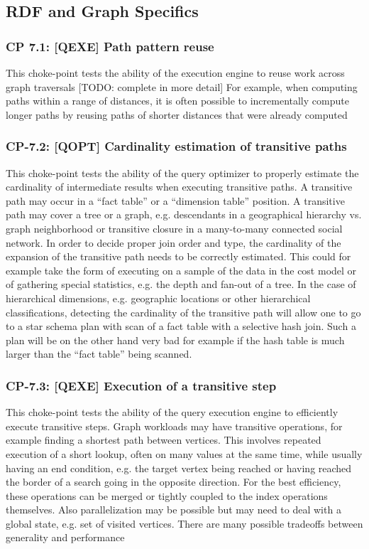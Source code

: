 
\subsection{RDF and Graph Specifics}

\subsubsection{CP 7.1: [QEXE] Path pattern reuse}
\label{choke_point_7.1}
This choke-point tests the ability of the execution engine to reuse work across graph traversals [TODO: complete in more detail]
For example, when computing paths within a range of distances, it is often possible to incrementally compute longer paths by reusing paths of shorter distances that were already computed

\subsubsection{CP-7.2: [QOPT]  Cardinality estimation of transitive paths}
\label{choke_point_7.2}
This choke-point tests the ability of the query optimizer to properly estimate the cardinality of intermediate results when executing transitive paths. A transitive path may occur in a ``fact table'' or a ``dimension table'' position.
A transitive path may cover a tree or a graph, e.g. descendants in a geographical hierarchy vs. graph neighborhood or transitive closure in a many-to-many connected social network.
In order to decide proper join order and type, the cardinality of the expansion of the transitive path needs to be correctly estimated.
This could for example take the form of executing on a sample of the data in the cost model or of gathering special statistics, e.g. the depth and fan-out of a tree. In the case of hierarchical dimensions,
e.g. geographic locations or other hierarchical classifications, detecting the cardinality of the transitive path will allow one to go to a star schema plan with scan of a fact table with a selective hash join.
Such a plan will be on the other hand very bad for example if the hash table is much larger than the ``fact table'' being scanned.

\subsubsection{CP-7.3: [QEXE] Execution of a transitive step}
\label{choke_point_7.3}
This choke-point tests the ability of the query execution engine to efficiently execute transitive steps. Graph workloads may have transitive operations, for example finding a shortest path between vertices.
This involves repeated execution of a short lookup, often on many values at the same time, while usually having an end condition, e.g. the target vertex being reached or having reached the border of a search going in the opposite direction.
For the best efficiency, these operations can be merged or tightly coupled to the index operations themselves. Also parallelization may be possible but may need to deal with a global state, e.g. set of visited vertices.
There are many possible tradeoffs between generality and performance

